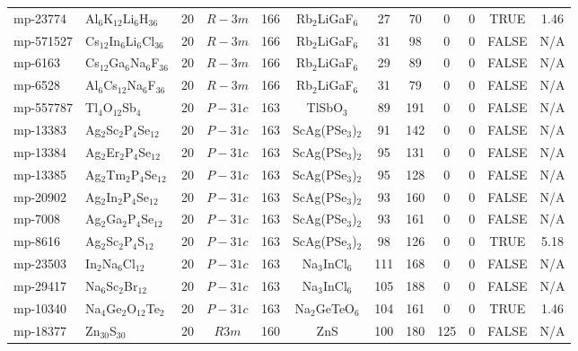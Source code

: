 {\begin{longtable}{llcccccccccc}
    mp-23774 & Al$_{6}$K$_{12}$Li$_{6}$H$_{36}$ & 20    & $R-3m$ & 166   & Rb$_{2}$LiGaF$_{6}$ & 27    & 70    & 0     & 0     & TRUE  & 1.46  \\
    mp-571527 & Cs$_{12}$In$_{6}$Li$_{6}$Cl$_{36}$ & 20    & $R-3m$ & 166   & Rb$_{2}$LiGaF$_{6}$ & 31    & 98    & 0     & 0     & FALSE & N/A \\
    mp-6163 & Cs$_{12}$Ga$_{6}$Na$_{6}$F$_{36}$ & 20    & $R-3m$ & 166   & Rb$_{2}$LiGaF$_{6}$ & 29    & 89    & 0     & 0     & FALSE & N/A \\
    mp-6528 & Al$_{6}$Cs$_{12}$Na$_{6}$F$_{36}$ & 20    & $R-3m$ & 166   & Rb$_{2}$LiGaF$_{6}$ & 31    & 79    & 0     & 0     & FALSE & N/A \\
    mp-557787 & Tl$_{4}$O$_{12}$Sb$_{4}$ & 20    & $P-31c$ & 163   & TlSbO$_{3}$ & 89    & 191   & 0     & 0     & FALSE & N/A \\
    mp-13383 & Ag$_{2}$Sc$_{2}$P$_{4}$Se$_{12}$ & 20    & $P-31c$ & 163   & ScAg(PSe$_{3}$)$_{2}$ & 91    & 142   & 0     & 0     & FALSE & N/A \\
    mp-13384 & Ag$_{2}$Er$_{2}$P$_{4}$Se$_{12}$ & 20    & $P-31c$ & 163   & ScAg(PSe$_{3}$)$_{2}$ & 95    & 131   & 0     & 0     & FALSE & N/A \\
    mp-13385 & Ag$_{2}$Tm$_{2}$P$_{4}$Se$_{12}$ & 20    & $P-31c$ & 163   & ScAg(PSe$_{3}$)$_{2}$ & 95    & 128   & 0     & 0     & FALSE & N/A \\
    mp-20902 & Ag$_{2}$In$_{2}$P$_{4}$Se$_{12}$ & 20    & $P-31c$ & 163   & ScAg(PSe$_{3}$)$_{2}$ & 93    & 160   & 0     & 0     & FALSE & N/A \\
    mp-7008 & Ag$_{2}$Ga$_{2}$P$_{4}$Se$_{12}$ & 20    & $P-31c$ & 163   & ScAg(PSe$_{3}$)$_{2}$ & 93    & 161   & 0     & 0     & FALSE & N/A \\
    mp-8616 & Ag$_{2}$Sc$_{2}$P$_{4}$S$_{12}$ & 20    & $P-31c$ & 163   & ScAg(PSe$_{3}$)$_{2}$ & 98    & 126   & 0     & 0     & TRUE  & 5.18  \\
    mp-23503 & In$_{2}$Na$_{6}$Cl$_{12}$ & 20    & $P-31c$ & 163   & Na$_{3}$InCl$_{6}$ & 111   & 168   & 0     & 0     & FALSE & N/A \\
    mp-29417 & Na$_{6}$Sc$_{2}$Br$_{12}$ & 20    & $P-31c$ & 163   & Na$_{3}$InCl$_{6}$ & 105   & 188   & 0     & 0     & FALSE & N/A \\
    mp-10340 & Na$_{4}$Ge$_{2}$O$_{12}$Te$_{2}$ & 20    & $P-31c$ & 163   & Na$_{2}$GeTeO$_{6}$ & 104   & 161   & 0     & 0     & TRUE  & 1.46  \\
    mp-18377 & Zn$_{30}$S$_{30}$ & 20    & $R3m$ & 160   & ZnS   & 100   & 180   & 125   & 0     & FALSE & N/A \\

\end{longtable}}
